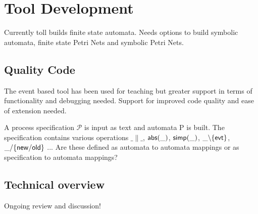 \documentclass[]{article}
\begin{document}
\newpage


\section{Tool Development}
Currently toll builds finite state automata. Needs options to build  symbolic automata, finite state Petri Nets and symbolic Petri Nets.

\subsection{Quality Code}
The event based tool has been used for teaching but greater support in terms of functionality and debugging needed. Support for improved code quality and ease of extension needed.


A process specification $\mathcal{P}$  is input as text and automata {\sf P} is built. The specification contains  various operations $\_\parallel\_$, ${\sf abs(\_)}$, ${\sf simp(\_)}$,  ${\sf \_\backslash\{evt\}}$, ${\sf \_/\{new/ old\}}$ ...
Are these defined as automata to automata mappings or as specification to automata mappings?






\subsection{Technical  overview} Ongoing review and discussion!
\end{document}
